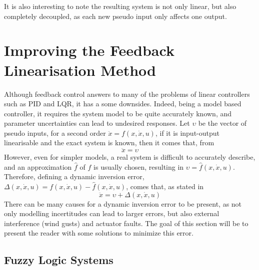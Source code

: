It is also interesting to note the resulting system is not only linear, but also completely decoupled, as each new pseudo input only affects one output.

\section{Improving the Feedback Linearisation Method}
\label{section:background/limitations}
Although feedback control answers to many of the problems of linear controllers such as PID and LQR, it has a some downsides. Indeed, being a model based controller, it requires the system model to be quite accurately known, and parameter uncertainties can lead to undesired responses. Let $\upsilon$ be the vector of pseudo inputs, for a second order $\ddot{x} = f(x,\dot{x},u)$, if it is input-output linearisable and the exact system is known, then it comes that, from \cite{YANG+LIN_Adaptive_Flight_Control}
\begin{equation}
\ddot{x}=\upsilon
\end{equation}
However, even for simpler models, a real system is difficult to accurately describe, and an approximation $\hat{f}$ of $f$ is usually chosen, resulting in $\upsilon=\hat{f}(x,\dot{x},u)$. Therefore, defining a dynamic inversion error, $\Delta(x,\dot{x},u)=f(x,\dot{x},u)-\hat{f}(x,\dot{x},u)$, comes that, as stated in \cite{YANG+LIN_Adaptive_Flight_Control}
\begin{equation}
\ddot{x}=\upsilon + \Delta(x,\dot{x},u)
\label{eq:system+error}
\end{equation}
There can be many causes for a dynamic inversion error to be present, as not only modelling incertitudes can lead to larger errors, but also external interference (wind gusts) and actuator faults. The goal of this section will be to present the reader with some solutions to minimize this error. 

\subsection{Fuzzy Logic Systems}
\label{section:background/fuzzy_logic}


